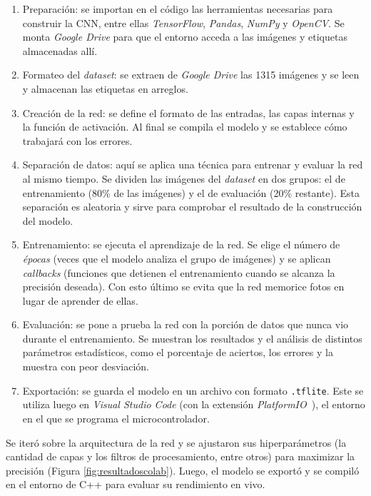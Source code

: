 \begin{enumerate}

\item Preparación: se importan en el código las herramientas necesarias para construir la CNN, entre ellas \emph{TensorFlow}, \emph{Pandas}, \emph{NumPy} y \emph{OpenCV}. Se monta \emph{Google Drive} para que el entorno acceda a las imágenes y etiquetas almacenadas allí.

\item Formateo del \emph{dataset}: se extraen de \emph{Google Drive} las 1315 imágenes y se leen y almacenan las etiquetas en arreglos.

\item Creación de la red: se define el formato de las entradas, las capas internas y la función de activación. Al final se compila el modelo y se establece cómo trabajará con los errores.

\item Separación de datos: aquí se aplica una técnica para entrenar y evaluar la red al mismo tiempo. Se dividen las imágenes del \emph{dataset} en dos grupos: el de entrenamiento (80\% de las imágenes) y el de evaluación (20\% restante). Esta separación es aleatoria y sirve para comprobar el resultado de la construcción del modelo.

\item Entrenamiento: se ejecuta el aprendizaje de la red. Se elige el número de \emph{épocas} (veces que el modelo analiza el grupo de imágenes) y se aplican \emph{callbacks} (funciones que detienen el entrenamiento cuando se alcanza la precisión deseada). Con esto último se evita que la red memorice fotos en lugar de aprender de ellas.

\item Evaluación: se pone a prueba la red con la porción de datos que nunca vio durante el entrenamiento. Se muestran los resultados y el análisis de distintos parámetros estadísticos, como el porcentaje de aciertos, los errores y la muestra con peor desviación.

\item Exportación: se guarda el modelo en un archivo con formato \texttt{.tflite}. Este se utiliza luego en \emph{Visual Studio Code} (con la extensión \emph{PlatformIO}~\cite{platformio}), el entorno en el que se programa el microcontrolador.

\end{enumerate}

Se iteró sobre la arquitectura de la red y se ajustaron sus hiperparámetros (la cantidad de capas y los filtros de procesamiento, entre otros) para maximizar la precisión (Figura \ref{fig:resultadoscolab}). Luego, el modelo se exportó y se compiló en el entorno de C++ para evaluar su rendimiento en vivo.

